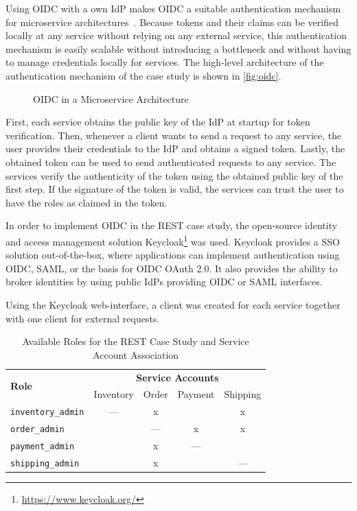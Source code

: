 Using \ac{OIDC} with a own \ac{IdP} makes \ac{OIDC} a suitable authentication mechanism for microservice architectures~\cite{Nehme2019}.
Because tokens and their claims can be verified locally at any service without relying on any external service, this authentication mechanism is easily scalable without introducing a bottleneck and without having to manage credentials locally for services.
The high-level architecture of the authentication mechanism of the case study is shown in \autoref{fig:oidc}.

\begin{figure}[!htb]
    \centering
    
    \caption{\ac{OIDC} in a Microservice Architecture}\label{fig:oidc}
\end{figure}

First, each service obtains the public key of the \ac{IdP} at startup for token verification.
Then, whenever a client wants to send a request to any service, the user provides their credentials to the \ac{IdP} and obtains a signed token.
Lastly, the obtained token can be used to send authenticated requests to any service.
The services verify the authenticity of the token using the obtained public key of the first step.
If the signature of the token is valid, the services can trust the user to have the roles as claimed in the token.

In order to implement \ac{OIDC} in the \ac{REST} case study, the open-source identity and access management solution Keycloak\footnote{\url{https://www.keycloak.org/}} was used.
Keycloak provides a \ac{SSO} solution out-of-the-box, where applications can implement authentication using \ac{OIDC}, \ac{SAML}, or the basis for \ac{OIDC} OAuth 2.0.
It also provides the ability to broker identities by using public \acp{IdP} providing \ac{OIDC} or \ac{SAML} interfaces.

Using the Keycloak web-interface, a client was created for each service together with one client for external requests.


\begin{table}[!htb]
    \centering
    \begin{tabular}{@{}lcccc@{}}
        \toprule
        \multirow{2}{*}{\textbf{Role}}  & \multicolumn{4}{c}{\textbf{Service Accounts}} \\
                                        & Inventory & Order & Payment   & Shipping      \\
        \midrule
        \texttt{inventory\_admin}       & ---       & x     &           & x             \\
        \texttt{order\_admin}           &           & ---   & x         & x             \\
        \texttt{payment\_admin}         &           & x     & ---       &               \\
        \texttt{shipping\_admin}        &           & x     &           & ---           \\
        \bottomrule
        
    \end{tabular}
    \caption{Available Roles for the \ac{REST} Case Study and Service Account Association}\label{tab:roles-rest}
\end{table}


